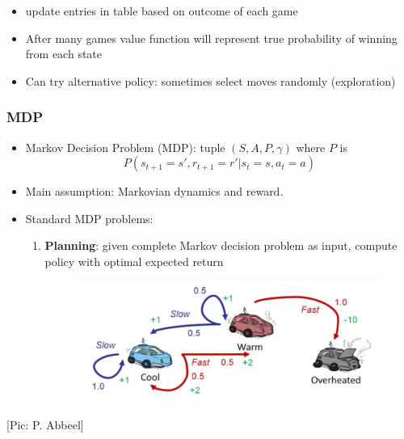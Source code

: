 \documentclass[handout]{beamer}
\renewcommand{\high}{\textbf}
\begin{document}
\begin{frame}
\begin{minipage}{7cm}
\begin{itemize}
\begin{itemize}
\item update entries in table based on outcome of each game
\item After many games value function will represent true probability of winning from each state
\end{itemize}
\end{itemize}
\end{minipage}
\begin{itemize}
\item Can try alternative policy: sometimes select moves randomly (exploration)
\end{itemize}
\end{frame}



\begin{frame}\frametitle{MDP}\small
\begin{itemize}
\item Markov Decision Problem (MDP): tuple $(S,A,P,\gamma)$ where $P$ is
\[
P(s_{t+1}=s', r_{t+1}=r' | s_t = s, a_t = a)
\]
\item Main assumption: Markovian dynamics and reward.
\item Standard MDP problems:
\begin{enumerate}
\item  \high{Planning}: given complete Markov decision problem as input, compute policy with optimal expected return
\begin{figure}
\includegraphics[width=0.7\linewidth]{Figures/rll6} 
\end{figure}
\end{enumerate}
\end{itemize}
\scriptsize [Pic: P. Abbeel]
\end{frame}
\end{document}
